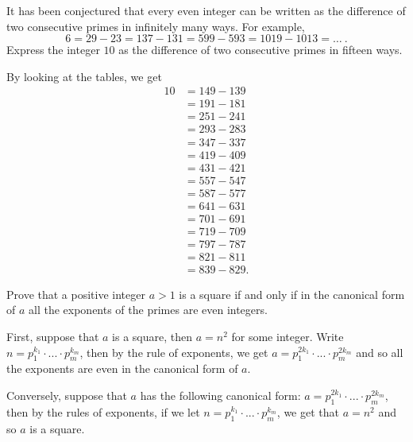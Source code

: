 \begin{exercise}
    It has been conjectured that every even integer can be written as the difference of two consecutive primes in infinitely many ways. For example, 
    $$6 = 29 - 23 = 137 - 131 = 599 - 593 = 1019 - 1013 = \dots \ .$$
    Express the integer $10$ as the difference of two consecutive primes in fifteen ways. \\
\end{exercise}

\begin{solution}
    By looking at the tables, we get
    \begin{align*}
        10 &= 149 - 139 \\
        &= 191 - 181 \\
        &= 251 - 241 \\
        &= 293 - 283 \\
        &= 347 - 337 \\
        &= 419 - 409 \\
        &= 431 - 421 \\
        &= 557 - 547 \\
        &= 587 - 577 \\
        &= 641 - 631 \\
        &= 701 - 691 \\
        &= 719 - 709 \\
        &= 797 - 787 \\
        &= 821 - 811 \\
        &= 839 - 829.
    \end{align*}
\end{solution}

\begin{exercise}
    Prove that a positive integer $a > 1$ is a square if and only if in the canonical form of $a$ all the exponents of the primes are even integers. \\
\end{exercise}

\begin{solution}
    First, suppose that $a$ is a square, then $a = n^2$ for some integer. Write $n = p_1^{k_1}\cdot ... \cdot p_m^{k_m}$, then by the rule of exponents, we get $a = p_1^{2k_1}\cdot ... \cdot p_m^{2k_m}$ and so all the exponents are even in the canonical form of $a$. 

    Conversely, suppose that $a$ has the following canonical form: $a = p_1^{2k_1}\cdot ... \cdot p_m^{2k_m}$, then by the rules of exponents, if we let $n = p_1^{k_1}\cdot ... \cdot p_m^{k_m}$, we get that $a = n^2$ and so $a$ is a square.\\
\end{solution}

